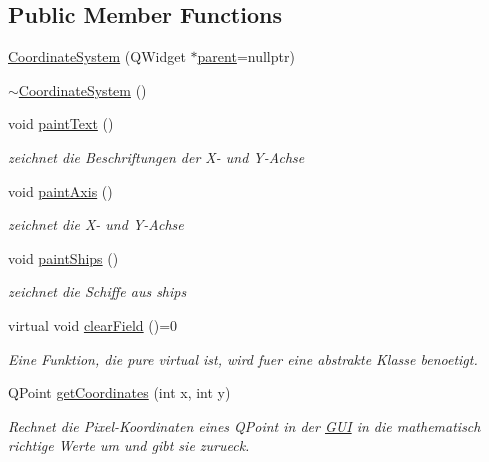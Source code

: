 \subsection*{Public Member Functions}
\begin{DoxyCompactItemize}
\item 
\hyperlink{classGUI_1_1CoordinateSystem_a279a1ccd5bfc8d71d086cb2d7fb77ec3}{Coordinate\+System} (Q\+Widget $\ast$\hyperlink{classGUI_1_1CoordinateSystem_a1799d742cabf4aedc2b3553023ccd368}{parent}=nullptr)
\item 
\hyperlink{classGUI_1_1CoordinateSystem_a6b68547f4cdb1b9a42b0e31fe61c3064}{$\sim$\+Coordinate\+System} ()
\item 
void \hyperlink{classGUI_1_1CoordinateSystem_a457f85ceb4ade790e815a0ea27e7760e}{paint\+Text} ()
\begin{DoxyCompactList}\small\item\em zeichnet die Beschriftungen der X-\/ und Y-\/\+Achse \end{DoxyCompactList}\item 
void \hyperlink{classGUI_1_1CoordinateSystem_ae1362a28cae5c9ba80e89b7a0734bf0b}{paint\+Axis} ()
\begin{DoxyCompactList}\small\item\em zeichnet die X-\/ und Y-\/\+Achse \end{DoxyCompactList}\item 
void \hyperlink{classGUI_1_1CoordinateSystem_a0abd1bd78d11330c8c70f9eaeec33c2f}{paint\+Ships} ()
\begin{DoxyCompactList}\small\item\em zeichnet die Schiffe aus ships \end{DoxyCompactList}\item 
virtual void \hyperlink{classGUI_1_1CoordinateSystem_a3d41bd83deb883b8d0c8d192bd0b1ddd}{clear\+Field} ()=0
\begin{DoxyCompactList}\small\item\em Eine Funktion, die pure virtual ist, wird fuer eine abstrakte Klasse benoetigt. \end{DoxyCompactList}\item 
Q\+Point \hyperlink{classGUI_1_1CoordinateSystem_a99abd61b7c05252962b38933538410a4}{get\+Coordinates} (int x, int y)
\begin{DoxyCompactList}\small\item\em Rechnet die Pixel-\/\+Koordinaten eines Q\+Point in der \hyperlink{namespaceGUI}{G\+UI} in die mathematisch richtige Werte um und gibt sie zurueck. \end{DoxyCompactList}\end{DoxyCompactItemize}
